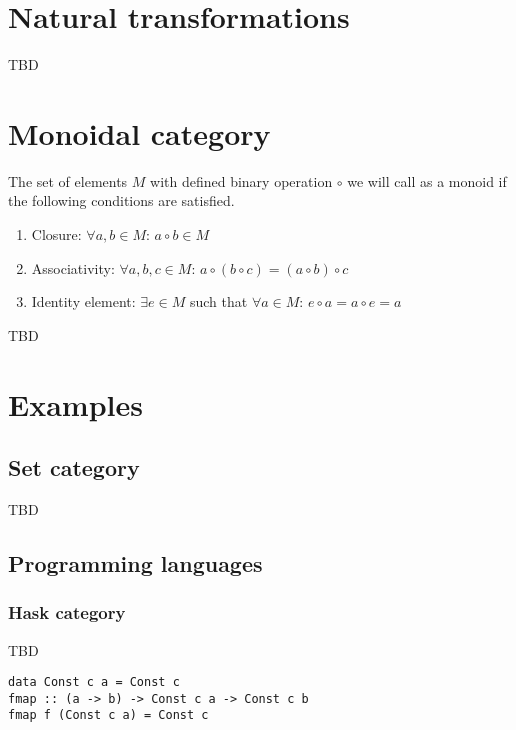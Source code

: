 \section{Natural transformations}

TBD

\section{Monoidal category}
\begin{definition}[Monoid]
  \label{def:monoid}
  The set of elements $M$ with defined binary operation $\circ$ we will call
  as a monoid if the following conditions are satisfied.
  \begin{enumerate}
  \item Closure: $\forall a, b \in M$: $a \circ b \in M$
  \item Associativity: $\forall a, b, c \in M$:
    $a \circ \left( b \circ c \right) =
    \left( a \circ b \right) \circ c$
  \item Identity element: $\exists e \in M$ such that
    $\forall a \in M$: $e \circ a = a \circ e = a$
  \end{enumerate}
\end{definition}
TBD


\section{Examples}

\subsection{\textbf{Set} category}
TBD

\subsection{Programming languages}

\subsubsection{\textbf{Hask} category}
TBD

\begin{example}
\label{ex:terminal_object_cat_hask}
\begin{verbatim}
data Const c a = Const c
fmap :: (a -> b) -> Const c a -> Const c b
fmap f (Const c a) = Const c
\end{verbatim}
\end{example}


